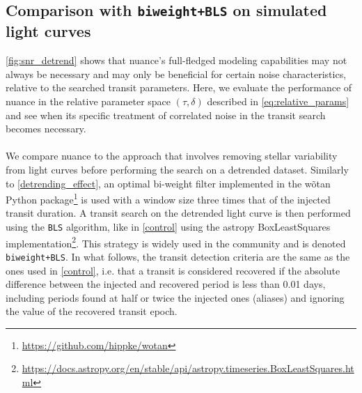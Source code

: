 \documentclass[modern]{aastex631}
\newcommand{\footlink}[1]{\footnote{\url{#1}}}
\begin{document}
\subsection{Comparison with \texttt{biweight+BLS} on simulated light curves}\label{simu}
\autoref{fig:snr_detrend} shows that \textsf{nuance}'s full-fledged modeling capabilities may not always be necessary and may only be beneficial for certain noise characteristics, relative to the searched transit parameters. Here, we evaluate the performance of \textsf{nuance} in the relative parameter space $(\tau, \delta)$ described in \autoref{eq:relative_params} and see when its specific treatment of correlated noise in the transit search becomes necessary.\\\\
We compare \textsf{nuance} to the approach that involves removing stellar variability from light curves before performing the search on a detrended dataset. Similarly to \autoref{detrending_effect}, an optimal bi-weight filter implemented in the \textsf{wõtan} Python package\footlink{https://github.com/hippke/wotan} is used with a window size three times that of the injected transit duration. A transit search on the detrended light curve is then performed using the \texttt{BLS} algorithm, like in \autoref{control} using the \textsf{astropy} \textsf{BoxLeastSquares} implementation\footlink{https://docs.astropy.org/en/stable/api/astropy.timeseries.BoxLeastSquares.html}. This strategy is widely used in the community and is denoted \texttt{biweight+BLS}. In what follows, the transit detection criteria are the same as the ones used in \autoref{control}, i.e. that a transit is considered recovered if the absolute difference between the injected and recovered period is less than 0.01 days, including periods found at half or twice the injected ones (aliases) and ignoring the value of the recovered transit epoch.
\end{document}
